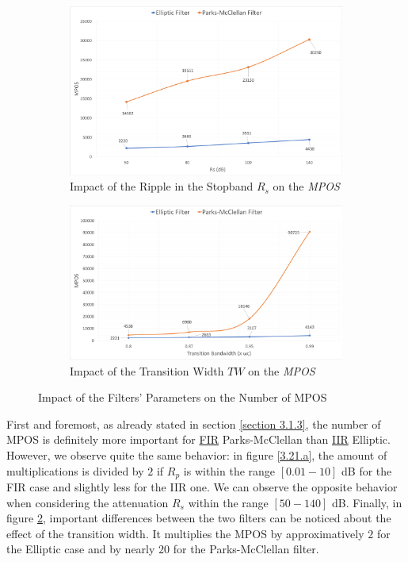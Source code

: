 \begin{figure}[ht!] \ContinuedFloat
\centering
	\begin{subfigure}[htb]{\textwidth}
		\centering
		\includegraphics[scale=0.275]{effect_Rs.png}
		\caption{Impact of the Ripple in the Stopband $R_s$ on the \textit{MPOS}}\label{3.21.b}
	\end{subfigure}
\par\bigskip
\centering
\begin{subfigure}[htb]{\textwidth} 
	\centering
	\includegraphics[scale=0.275]{effect_TW.png}
	\caption{Impact of the Transition Width $TW$ on the \textit{MPOS}}\label{3.21.c}
\end{subfigure}
\captionsetup{width=0.95\linewidth}
\caption{Impact of the Filters' Parameters on the Number of MPOS}\label{Figure 3.21}
\end{figure}

First and foremost, as already stated in section \ref{section 3.1.3}, the number of MPOS is definitely more important for \hyperlink{FIR}{FIR} Parks-McClellan than \hyperlink{IIR}{IIR} Elliptic. However, we observe quite the same behavior: in figure \ref{3.21.a}, the amount of multiplications is divided by $2$ if $R_p$ is within the range $[0.01 - 10]$ dB for the FIR case and slightly less for the IIR one. We can observe the opposite behavior when considering the attenuation $R_s$ within the range $[50 - 140]$ dB. Finally, in figure \ref{3.21.c}, important differences between the two filters can be noticed about the effect of the transition width. It multiplies the MPOS by approximatively $2$ for the Elliptic case and by nearly $20$ for the Parks-McClellan filter.

